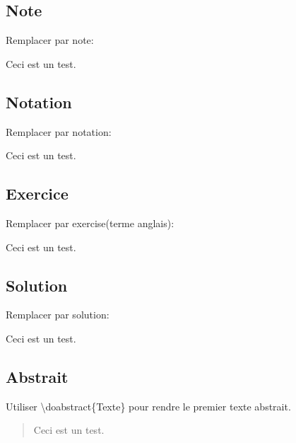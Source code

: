 \documentclass[a4paper, 11pt]{article}
\begin{document}
\subsection{Note}
\label{sub:note}
Remplacer par note:
\begin{note}
Ceci est un test.
\end{note}

\subsection{Notation} %
\label{sub:notation}
Remplacer par notation:
\begin{notation}
Ceci est un test.
\end{notation}

\subsection{Exercice} %
\label{sub:exercice}
Remplacer par exercise(terme anglais):
\begin{exercise}
Ceci est un test.
\end{exercise}

\subsection{Solution} %
\label{sub:solution}
Remplacer par solution:
\begin{solution}
Ceci est un test.
\end{solution}

\subsection{Abstrait} %
\label{sub:abstrait}
Utiliser \textbackslash doabstract\{Texte\} pour rendre le premier texte abstrait.
\begin{abstract}
Ceci est un test.
\end{abstract}
\end{document}

